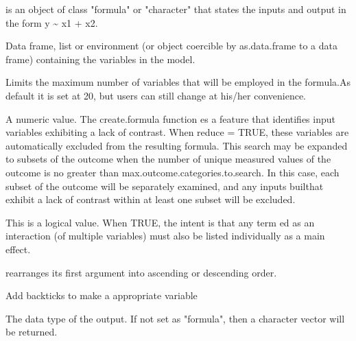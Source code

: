 \documentclass[a4paper]{book}
\begin{document}
\begin{Arguments}
\begin{ldescription}
\item[\code{the.initial.formula}] is an object of class "formula" or "character"
that states the inputs and output in the form y \textasciitilde{} x1 + x2.

\item[\code{dat}] Data frame, list or environment (or object coercible by
as.data.frame to a data frame) containing the variables in the model.

\item[\code{max.input.categories}] Limits the maximum number of variables that will
be employed in the formula.As default it is set at 20, but users can still
change at his/her convenience.

\item[\code{max.outcome.categories.to.search}] A numeric value. The create.formula
function es a feature that identifies input variables exhibiting a lack of
contrast. When reduce = TRUE, these variables are automatically excluded from
the resulting formula. This search may be expanded to subsets of the outcome
when the number of unique measured values of the outcome is no greater than
max.outcome.categories.to.search. In this case, each subset of the outcome
will be separately examined, and any inputs builthat exhibit a lack of
contrast within at least one subset will be excluded.

\item[\code{force.main.effects}] This is a logical value.  When TRUE, the intent is
that any term ed as an interaction (of multiple variables) must also be
listed individually as a main effect.

\item[\code{order.as}] rearranges its first argument into ascending or descending
order.

\item[\code{include.backtick}] Add backticks to make a appropriate variable

\item[\code{format.as}] The data type of the output.  If not set as "formula", then
a character vector will be returned.
\end{ldescription}
\end{Arguments}
%
\begin{Examples}
\end{Examples}
\end{document}
